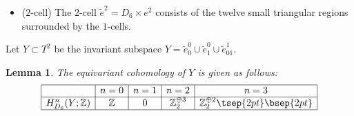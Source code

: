 \documentclass[pdftex]{sigma}
\newtheorem{lem}[thm]{Lemma}
\theoremstyle{definition}
\newcommand{\Z}{\mathbb{Z}}
\begin{document}
\begin{itemize}
\item
($2$-cell)
The $2$-cell $\tilde{e}^2 = D_6 \times e^2$ consists of the twelve small triangular regions surrounded by the $1$-cells.
\end{itemize}

Let $Y \subset T^2$ be the invariant subspace $Y = \tilde{e}^0_0 \cup \tilde{e}^0_1 \cup \tilde{e}^1_{01}$.


\begin{lem} \label{lem:p6m_Y}
The equivariant cohomology of $Y$ is given as follows:
$$
\begin{array}{|c|c|c|c|c|}
\hline
 & n = 0 & n = 1 & n = 2 & n = 3 \\
\hline
H^n_{D_6}(Y; \Z) & \Z & 0 & \Z_2^{\oplus 3} & \Z_2^{\oplus 2} \tsep{2pt}\bsep{2pt} \\
\hline
\end{array}
$$
\end{lem}
\end{document}
